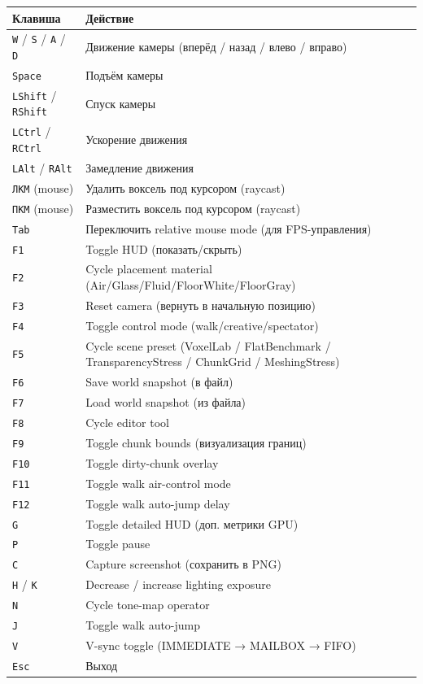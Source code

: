 \begin{longtable}[]{@{}ll@{}}
\toprule\noalign{}
Клавиша & Действие \\
\midrule\noalign{}
\endhead
\bottomrule\noalign{}
\endlastfoot
\texttt{W} / \texttt{S} / \texttt{A} / \texttt{D} & Движение камеры (вперёд / назад / влево / вправо) \\
\texttt{Space} & Подъём камеры \\
\texttt{LShift} / \texttt{RShift} & Спуск камеры \\
\texttt{LCtrl} / \texttt{RCtrl} & Ускорение движения \\
\texttt{LAlt} / \texttt{RAlt} & Замедление движения \\
\texttt{ЛКМ} (mouse) & Удалить воксель под курсором (raycast) \\
\texttt{ПКМ} (mouse) & Разместить воксель под курсором (raycast) \\
\texttt{Tab} & Переключить relative mouse mode (для FPS-управления) \\
\texttt{F1} & Toggle HUD (показать/скрыть) \\
\texttt{F2} & Cycle placement material (Air/Glass/Fluid/FloorWhite/FloorGray) \\
\texttt{F3} & Reset camera (вернуть в начальную позицию) \\
\texttt{F4} & Toggle control mode (walk/creative/spectator) \\
\texttt{F5} & Cycle scene preset (VoxelLab / FlatBenchmark / TransparencyStress / ChunkGrid / MeshingStress) \\
\texttt{F6} & Save world snapshot (в файл) \\
\texttt{F7} & Load world snapshot (из файла) \\
\texttt{F8} & Cycle editor tool \\
\texttt{F9} & Toggle chunk bounds (визуализация границ) \\
\texttt{F10} & Toggle dirty-chunk overlay \\
\texttt{F11} & Toggle walk air-control mode \\
\texttt{F12} & Toggle walk auto-jump delay \\
\texttt{G} & Toggle detailed HUD (доп. метрики GPU) \\
\texttt{P} & Toggle pause \\
\texttt{C} & Capture screenshot (сохранить в PNG) \\
\texttt{H} / \texttt{K} & Decrease / increase lighting exposure \\
\texttt{N} & Cycle tone-map operator \\
\texttt{J} & Toggle walk auto-jump \\
\texttt{V} & V-sync toggle (IMMEDIATE → MAILBOX → FIFO) \\
\texttt{Esc} & Выход \\
\end{longtable}

